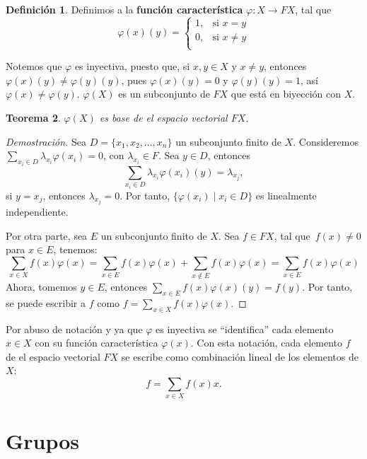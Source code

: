 \documentclass[12pt]{book}
\newtheorem{theorem}{Teorema}[section]
\theoremstyle{definition}
\newtheorem{definition}[theorem]{Definición}
\newcounter{in}
\newcounter{ini}
\begin{document}
\begin{definition}
  \label{fun-caracteristica}
  Definimos a la \textbf{función característica} $\varphi:X\rightarrow
  FX$, tal que
  \[
  \varphi(x)(y)=
  \begin{cases}
    1, & \text{si } x=y \\
    0, & \text{si } x\neq y \\
  \end{cases}
  \]
\end{definition}
Notemos que $\varphi$ es inyectiva, puesto que, si $x,y\in X$ y $x\neq y$,
entonces $\varphi(x)(y)\neq\varphi(y)(y)$, pues
$\varphi(x)(y)=0$ y $\varphi(y)(y)=1$, así
$\varphi(x)\neq\varphi(y)$. $\varphi(X)$ es un subconjunto de $FX$ que
está en biyección con $X$.
\begin{theorem}
  \label{base-FX}
  $\varphi(X)$ es base de el espacio vectorial $FX$.
\end{theorem}
\begin{proof}[Demostración]
  Sea $D=\{x_{1},x_{2},\dots,x_{n}\}$ un subconjunto finito de $X$. Consideremos
  $\sum_{x_{i}\in D} \lambda_{x_{i}}\varphi(x_{i})=0$, con
  $\lambda_{x_{i}}\in F$. Sea $y\in D$, entonces
  $$\sum_{x_{i}\in D} \lambda_{x_{i}}\varphi(x_{i})(y)=\lambda_{x_{j}},$$
  si $y=x_{j}$, entonces $\lambda_{x_{j}}=0$. Por tanto, $\{\varphi(x_{i})\mid x_{i}\in D\}$ es linealmente independiente.

  Por otra parte, sea $E$ un subconjunto finito de $X$. Sea $f\in FX$, tal que~$f(x)\neq 0$ para $x\in E$, tenemos:
  $$\sum_{x\in X}f(x)\varphi(x)=\sum_{x\in
    E}f(x)\varphi(x)+\sum_{x\not\in E}f(x)\varphi(x)=\sum_{x\in E}f(x)\varphi(x)$$
  Ahora, tomemos $y\in E$, entonces $\sum_{x\in
    E}f(x)\varphi(x)(y)=f(y)$. Por tanto, se puede escribir a $f$ como $f=\sum_{x\in X}f(x)\varphi(x)$. 
\end{proof}

Por abuso de notación y ya que $\varphi$ es inyectiva se
``identifica'' cada elemento $x\in X$ con su función característica
$\varphi(x)$. Con esta notación, cada elemento $f$ de el espacio vectorial
$FX$ se escribe como combinación lineal de los elementos de $X$:
\begin{equation}
  \label{sumas-formales}
  f=\sum_{x\in X} f(x)x.
\end{equation}

\section{Grupos}
\label{grupos}
\end{document}
